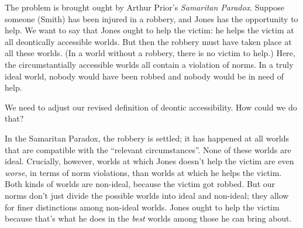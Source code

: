 The problem is brought ought by Arthur Prior's \emph{Samaritan Paradox}. Suppose
someone (Smith) has been injured in a robbery, and Jones has the opportunity to
help. We want to say that Jones ought to help the victim: he helps the victim at
all deontically accessible worlds. But then the robbery must have taken place at
all these worlds. (In a world without a robbery, there is no victim to help.)
Here, the circumstantially accessible worlds all contain a violation of norms.
In a truly ideal world, nobody would have been robbed and nobody would be in
need of help.

We need to adjust our revised definition of deontic accessibility. How could we
do that?

In the Samaritan Paradox, the robbery is settled; it has happened at all worlds
that are compatible with the ``relevant circumstances''. None of these worlds
are ideal. Crucially, however, worlds at which Jones doesn't help the victim are
even \emph{worse}, in terms of norm violations, than worlds at which he helps
the victim. Both kinds of worlds are non-ideal, because the victim got robbed.
But our norms don't just divide the possible worlds into ideal and non-ideal;
they allow for finer distinctions among non-ideal worlds. Jones ought to help
the victim because that's what he does in the \emph{best} worlds among those he
can bring about.


